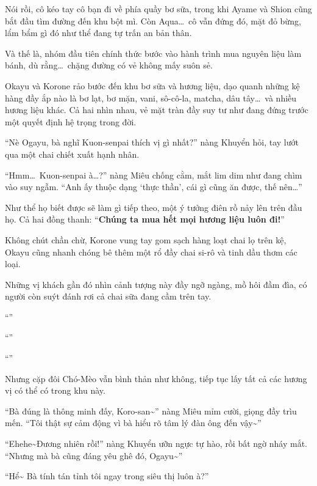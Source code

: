 \documentclass[../main.tex]{subfiles}
\begin{document}
Nói rồi, cô kéo tay cô bạn đi về phía quầy bơ sữa, trong khi Ayame và Shion cũng bắt đầu tìm đường đến khu bột mì. Còn Aqua\dots\ cô vẫn đứng đó, mặt đỏ bừng, lẩm bẩm gì đó như thể đang tự trấn an bản thân.

Và thế là, nhóm đầu tiên chính thức bước vào hành trình mua nguyên liệu làm bánh, dù rằng\dots\ chặng đường có vẻ không mấy suôn sẻ.

\ct

Okayu và Korone rảo bước đến khu bơ sữa và hương liệu, dạo quanh những kệ hàng đầy ắp nào là bơ lạt, bơ mặn, vani, sô-cô-la, matcha, dâu tây\dots\ và nhiều hương liệu khác. Cả hai nhìn nhau, vẻ mặt tràn đầy suy tư như đang đứng trước một quyết định hệ trọng trong đời.

``Nè Ogayu, bà nghĩ Kuon-senpai thích vị gì nhất?'' nàng Khuyển hỏi, tay lướt qua một chai chiết xuất hạnh nhân.

``Hmm\dots\ Kuon-senpai à\dots?'' nàng Miêu chống cằm, mắt lim dim như đang chìm vào suy ngẫm. ``Anh ấy thuộc dạng `thực thần', cái gì cũng ăn được, thế nên\dots''

Như thể họ biết được sẽ làm gì tiếp theo, một ý tưởng điên rồ nảy lên trên đầu họ. Cả hai đồng thanh: ``\textbf{Chúng ta mua hết mọi hương liệu luôn đi!}''

Không chút chần chừ, Korone vung tay gom sạch hàng loạt chai lọ trên kệ, Okayu cũng nhanh chóng bê thêm một rổ đầy chai si-rô và tinh dầu thơm các loại.

Những vị khách gần đó nhìn cảnh tượng này đầy ngỡ ngàng, mồ hôi đầm đìa, có người còn suýt đánh rơi cả chai sữa đang cầm trên tay.

``''

``''

``''

Nhưng cặp đôi Chó-Mèo vẫn bình thản như không, tiếp tục lấy tất cả các hương vị có thể có trong khu này.

``Bà đúng là thông minh đấy, Koro-san\~{}'' nàng Miêu mỉm cười, giọng đầy trìu mến. ``Tôi thật sự cảm động vì bà hiểu rõ tâm lý đàn ông đến vậy\~{}''

``Ehehe\~{}Đương nhiên rồi!'' nàng Khuyển ưỡn ngực tự hào, rồi bất ngờ nháy mắt. ``Nhưng mà bà cũng đáng yêu ghê đó, Ogayu\~{}''

``Hể\~{} Bà tính tán tỉnh tôi ngay trong siêu thị luôn à?''
\end{document}

